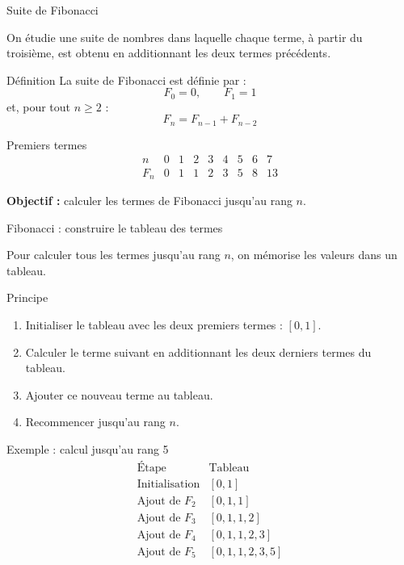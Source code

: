 \documentclass[10pt]{beamer}
\begin{document}
\begin{frame}{Suite de Fibonacci}

On étudie une suite de nombres dans laquelle chaque terme,
à partir du troisième, est obtenu en additionnant les deux
termes précédents.

\begin{block}{Définition}
La suite de Fibonacci est définie par :
\[
F_0 = 0,\qquad F_1 = 1
\]
et, pour tout $n \geq 2$ :
\[
F_n = F_{n-1} + F_{n-2}
\]
\end{block}

\pause

\begin{exampleblock}{Premiers termes}
\[
\begin{array}{c|cccccccc}
n   & 0 & 1 & 2 & 3 & 4 & 5 & 6 & 7\\
\hline
F_n & 0 & 1 & 1 & 2 & 3 & 5 & 8 & 13
\end{array}
\]
\end{exampleblock}

\pause

\textbf{Objectif :} calculer les termes de Fibonacci jusqu'au rang $n$.

\end{frame}
\begin{frame}{Fibonacci : construire le tableau des termes}

Pour calculer tous les termes jusqu'au rang $n$,
on mémorise les valeurs dans un tableau.

\begin{block}{Principe}
\begin{enumerate}
    \item Initialiser le tableau avec les deux premiers termes :
    $[0,1]$.
    \item Calculer le terme suivant en additionnant les deux
    derniers termes du tableau.
    \item Ajouter ce nouveau terme au tableau.
    \item Recommencer jusqu'au rang $n$.
\end{enumerate}
\end{block}

\pause

\begin{exampleblock}{Exemple : calcul jusqu'au rang 5}
\[
\begin{array}{c|l}
\text{Étape} & \text{Tableau}\\
\hline
\text{Initialisation} & [0,1]\\
\text{Ajout de } F_2 & [0,1,1]\\
\text{Ajout de } F_3 & [0,1,1,2]\\
\text{Ajout de } F_4 & [0,1,1,2,3]\\
\text{Ajout de } F_5 & [0,1,1,2,3,5]
\end{array}
\]
\end{exampleblock}

\end{frame}
\end{document}
